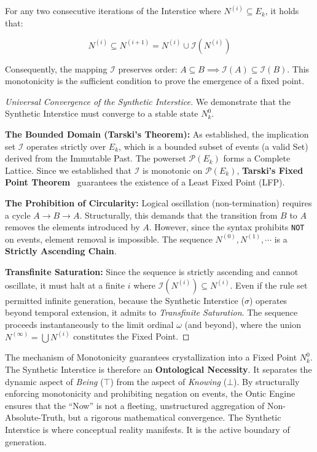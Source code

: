 \documentclass[11pt, a4paper]{article}
\theoremstyle{formalism}
\begin{document}
For any two consecutive iterations of the Interstice where $N^{(i)} \subseteq
E_k$, it holds that:

\begin{equation}
    N^{(i)} \subseteq N^{(i+1)} = N^{(i)} \cup \mathcal{I}(N^{(i)})
\end{equation}

Consequently, the mapping $\mathcal{I}$ preserves order: $A \subseteq B
\implies \mathcal{I}(A) \subseteq \mathcal{I}(B)$. This monotonicity is the
sufficient condition to prove the emergence of a fixed point.

\begin{proof}[Universal Convergence of the Synthetic Interstice]

    We demonstrate that the Synthetic Interstice must converge to a stable
    state $N^0_k$.

    \textbf{The Bounded Domain (Tarski's Theorem):} As established, the 
    implication set $\mathcal{I}$ operates strictly over $E_k$, which is a bounded 
    subset of events (a valid Set) derived from the Immutable Past. The powerset
    $\mathcal{P}(E_k)$ forms a Complete Lattice. Since we established
    that $\mathcal{I}$ is monotonic on $\mathcal{P}(E_k)$,
    \textbf{Tarski's Fixed Point Theorem}~\cite{Tarski1955} guarantees the
    existence of a Least Fixed Point (LFP).
    
    \textbf{The Prohibition of Circularity:} Logical oscillation
    (non-termination) requires a cycle $A \to B \to A$. Structurally, this
    demands that the transition from $B$ to $A$ removes the elements introduced
    by $A$. However, since the syntax prohibits \texttt{NOT} on events, element
    removal is impossible. The sequence $N^{(0)}, N^{(1)}, \cdots$ is a
    \textbf{Strictly Ascending Chain}.
    
    \textbf{Transfinite Saturation:} Since the sequence is strictly ascending 
    and cannot oscillate, it must halt at a finite $i$ where $\mathcal{I}(N^{(i)}) \subseteq N^{(i)}$.
    Even if the rule set permitted infinite generation, because the Synthetic
    Interstice ($\sigma$) operates beyond temporal extension, it admits to \textit{Transfinite
    Saturation}. The sequence proceeds instantaneously to the limit ordinal $\omega$ (and
    beyond), where the union $N^{(\infty)} = \bigcup N^{(i)}$ constitutes
    the Fixed Point.

\end{proof}

The mechanism of Monotonicity guarantees crystallization into a Fixed Point
$N^0_k$. The Synthetic Interstice is therefore an \textbf{Ontological
Necessity}. It separates the dynamic aspect of \textit{Being} ($\top$) from
the aspect of \textit{Knowing} ($\bot$). By structurally enforcing
monotonicity and prohibiting negation on events, the Ontic Engine ensures that
the ``Now'' is not a fleeting, unstructured aggregation of
Non-Absolute-Truth, but a rigorous mathematical convergence. The Synthetic
Interstice is where conceptual reality manifests. It is the active boundary
of generation.
\end{document}
